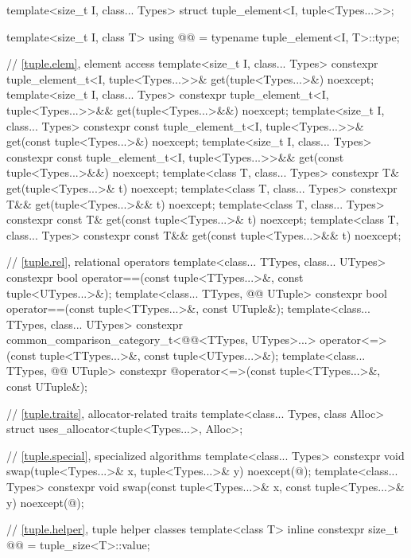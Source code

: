 \begin{codeblock}
{  template<size_t I, class... Types>
    struct tuple_element<I, tuple<Types...>>;

  template<size_t I, class T>
    using @@ = typename tuple_element<I, T>::type;

  // \ref{tuple.elem}, element access
  template<size_t I, class... Types>
    constexpr tuple_element_t<I, tuple<Types...>>& get(tuple<Types...>&) noexcept;
  template<size_t I, class... Types>
    constexpr tuple_element_t<I, tuple<Types...>>&& get(tuple<Types...>&&) noexcept;
  template<size_t I, class... Types>
    constexpr const tuple_element_t<I, tuple<Types...>>& get(const tuple<Types...>&) noexcept;
  template<size_t I, class... Types>
    constexpr const tuple_element_t<I, tuple<Types...>>&& get(const tuple<Types...>&&) noexcept;
  template<class T, class... Types>
    constexpr T& get(tuple<Types...>& t) noexcept;
  template<class T, class... Types>
    constexpr T&& get(tuple<Types...>&& t) noexcept;
  template<class T, class... Types>
    constexpr const T& get(const tuple<Types...>& t) noexcept;
  template<class T, class... Types>
    constexpr const T&& get(const tuple<Types...>&& t) noexcept;

  // \ref{tuple.rel}, relational operators
  template<class... TTypes, class... UTypes>
    constexpr bool operator==(const tuple<TTypes...>&, const tuple<UTypes...>&);
  template<class... TTypes, @@ UTuple>
    constexpr bool operator==(const tuple<TTypes...>&, const UTuple&);
  template<class... TTypes, class... UTypes>
    constexpr common_comparison_category_t<@@<TTypes, UTypes>...>
      operator<=>(const tuple<TTypes...>&, const tuple<UTypes...>&);
  template<class... TTypes, @@ UTuple>
    constexpr @\seebelownc@ operator<=>(const tuple<TTypes...>&, const UTuple&);

  // \ref{tuple.traits}, allocator-related traits
  template<class... Types, class Alloc>
    struct uses_allocator<tuple<Types...>, Alloc>;

  // \ref{tuple.special}, specialized algorithms
  template<class... Types>
    constexpr void swap(tuple<Types...>& x, tuple<Types...>& y) noexcept(@\seebelow@);
  template<class... Types>
    constexpr void swap(const tuple<Types...>& x, const tuple<Types...>& y) noexcept(@\seebelow@);

  // \ref{tuple.helper}, tuple helper classes
  template<class T>
    inline constexpr size_t @@ = tuple_size<T>::value;
}
\end{codeblock}

